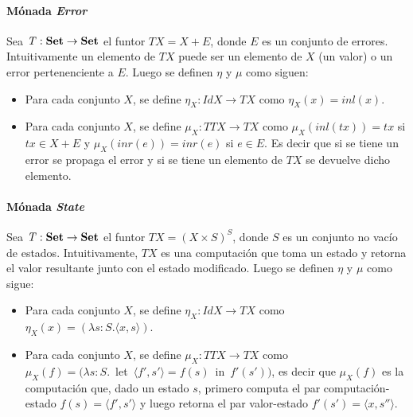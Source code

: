 \paragraph{M\'onada \textit{Error}}
Sea $\mathit{T} : \text{\bf Set} \rightarrow \text{\bf Set}$ el funtor $\mathit{T} X = X + E$, donde $E$ es un conjunto de errores. Intuitivamente un elemento de $\mathit{T} X$ puede ser un elemento de $X$ (un valor) o un error pertenenciente a $E$. Luego se definen $\eta$ y $\mu$ como siguen:
\vspace{-0.75\baselineskip}
\begin{itemize}[noitemsep, label=$\blacktriangleright$]
	\item Para cada conjunto $X$, se define $\eta_X : \mathit{Id} X \rightarrow \mathit{T} X$ como $\eta_X (x) = inl(x)$.
	\item Para cada conjunto $X$, se define $\mu_X : \mathit{T T} X \rightarrow \mathit{T} X$ como $\mu_X (inl(tx)) = tx$ si $tx \in X + E$ y $\mu_X (inr(e)) = inr(e)$ si $e \in E$. Es decir que si se tiene un error se propaga el error y si se tiene un elemento de $\mathit{T} X$ se devuelve dicho elemento. 
\end{itemize}

\paragraph{M\'onada \textit{State}}
Sea $\mathit{T} : \text{\bf Set} \rightarrow \text{\bf Set}$ el funtor $\mathit{T} X = (X \times S)^S$, donde $S$ es un conjunto no vacío de estados. Intuitivamente, $\mathit{T} X$ es una computación que toma un estado y retorna el valor resultante junto con el estado modificado. Luego se definen $\eta$ y $\mu$ como sigue:
\vspace{-0.75\baselineskip}
\begin{itemize}[noitemsep, label=$\blacktriangleright$]
	\item Para cada conjunto $X$, se define $\eta_X : \mathit{Id} X \rightarrow \mathit{T} X$ como $\eta_X (x) = (\lambda s : S . \langle x , s \rangle)$.
	\item Para cada conjunto $X$, se define $\mu_X : \mathit{T T} X \rightarrow \mathit{T} X$ como \\ \mbox{$\mu_X (f) = (\lambda s : S .$ let $\langle f' , s' \rangle = f(s)$ in $f'(s'))$}, es decir que $\mu_X (f)$ es la computación que, dado un estado $s$, primero computa el par computación-estado $f(s) = \langle f' , s' \rangle$ y luego retorna el par valor-estado $f'(s') = \langle x , s'' \rangle$.   
\end{itemize}

